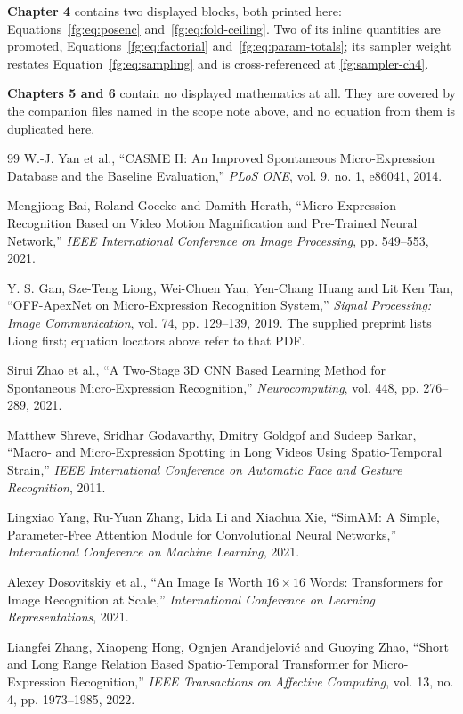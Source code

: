 \documentclass[11pt,a4paper]{article}
\numberwithin{equation}{section}
\begin{document}
\textbf{Chapter 4} contains two displayed blocks, both printed here:
Equations~\eqref{fg:eq:posenc} and~\eqref{fg:eq:fold-ceiling}. Two of its
inline quantities are promoted, Equations~\eqref{fg:eq:factorial}
and~\eqref{fg:eq:param-totals}; its sampler weight restates
Equation~\eqref{fg:eq:sampling} and is cross-referenced at
\autoref{fg:sampler-ch4}.

\textbf{Chapters 5 and 6} contain no displayed mathematics at all. They are
covered by the companion files named in the scope note above, and no equation
from them is duplicated here.

\begin{thebibliography}{99}
W.-J. Yan et al., ``CASME II: An Improved Spontaneous Micro-Expression Database
and the Baseline Evaluation,'' \emph{PLoS ONE}, vol. 9, no. 1, e86041, 2014.

Mengjiong Bai, Roland Goecke and Damith Herath, ``Micro-Expression Recognition
Based on Video Motion Magnification and Pre-Trained Neural Network,''
\emph{IEEE International Conference on Image Processing}, pp. 549--553, 2021.

Y. S. Gan, Sze-Teng Liong, Wei-Chuen Yau, Yen-Chang Huang and Lit Ken Tan,
``OFF-ApexNet on Micro-Expression Recognition System,''
\emph{Signal Processing: Image Communication}, vol. 74, pp. 129--139, 2019.
The supplied preprint lists Liong first; equation locators above refer to that PDF.

Sirui Zhao et al., ``A Two-Stage 3D CNN Based Learning Method for Spontaneous
Micro-Expression Recognition,'' \emph{Neurocomputing}, vol. 448,
pp. 276--289, 2021.

Matthew Shreve, Sridhar Godavarthy, Dmitry Goldgof and Sudeep Sarkar,
``Macro- and Micro-Expression Spotting in Long Videos Using Spatio-Temporal
Strain,'' \emph{IEEE International Conference on Automatic Face and Gesture
Recognition}, 2011.

Lingxiao Yang, Ru-Yuan Zhang, Lida Li and Xiaohua Xie,
``SimAM: A Simple, Parameter-Free Attention Module for Convolutional Neural
Networks,'' \emph{International Conference on Machine Learning}, 2021.

Alexey Dosovitskiy et al., ``An Image Is Worth $16\times16$ Words:
Transformers for Image Recognition at Scale,''
\emph{International Conference on Learning Representations}, 2021.

Liangfei Zhang, Xiaopeng Hong, Ognjen Arandjelovi{\'c} and Guoying Zhao,
``Short and Long Range Relation Based Spatio-Temporal Transformer for
Micro-Expression Recognition,'' \emph{IEEE Transactions on Affective
Computing}, vol. 13, no. 4, pp. 1973--1985, 2022.


\end{thebibliography}
\end{document}
